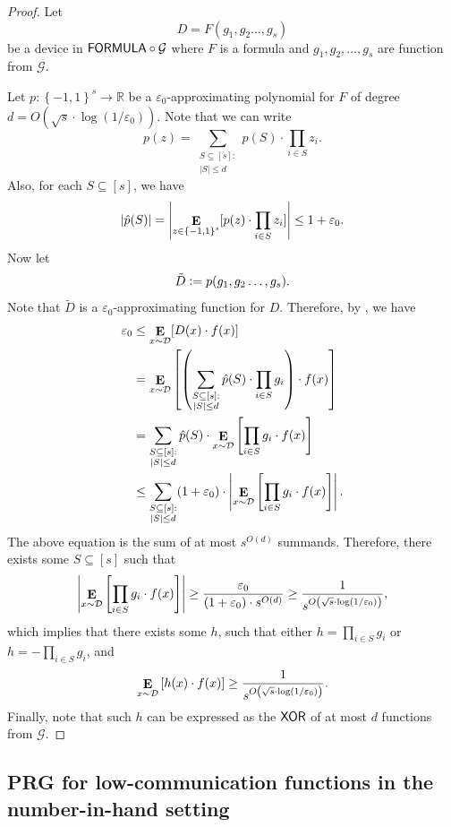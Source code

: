 \documentclass[10pt,a4paper]{article}
\DeclareMathOperator*\Exp{{\bf E}}
\newcommand{\boolpm}{\left\{-1,1\right\}}
\newcommand{\FORMULA}{{\sf FORMULA}}
\newcommand{\XOR}{{\sf XOR}}
\newcommand{\real}{\mathbb{R}}
\begin{document}
    \begin{proof}
		Let 
		\[
			D = F(g_1,g_2\dots,g_s)
		\]
		be a device in $\FORMULA\circ\mathcal{G}$ where $F$ is a formula and $g_1,g_2,\dots,g_s$ are function from $\mathcal{G}$.

		Let $p\colon\boolpm^s\to\real$ be a $\varepsilon_0$-approximating polynomial for $F$ of degree $d=O(\sqrt{s}\cdot\log(1/\varepsilon_0))$. Note that we can write
		\[
			p(z)=\sum_{\substack{S\subseteq[s]: \\ |S|\leq d}}\hat{p}(S)\cdot\prod_{i\in S}z_i.
		\]
		Also, for each $S\subseteq[s]$, we have
		\[
			|\hat{p}(S)|=\left| \Exp_{z\in\boolpm^s}[p(z)\cdot\prod_{i\in S}z_i] \right| \leq  1+\varepsilon_0.
		\]
		Now let
		\[
			\tilde{D} \vcentcolon= p(g_1,g_2\dots,g_s).
		\]
		Note that $\tilde{D}$ is a $\varepsilon_0$-approximating function for $D$. Therefore, by , we have
		\begin{align*}
			\varepsilon_0 &\leq \Exp_{x\sim\mathcal{D}}[D(x)\cdot f(x)]\\
			&= \Exp_{x\sim\mathcal{D}}\left[\left(\sum_{\substack{S\subseteq[s]: \\ |S|\leq d}}\hat{p}(S)\cdot\prod_{i\in S}g_i \right) \cdot f(x)\right]\\
			&=\sum_{\substack{S\subseteq[s]: \\ |S|\leq d}}\hat{p}(S)\cdot \Exp_{x\sim\mathcal{D}}\left[\prod_{i\in S}g_i\cdot f(x)\right]\\
			&\leq \sum_{\substack{S\subseteq[s]: \\ |S|\leq d}} (1+\varepsilon_0) \cdot \left| \Exp_{x\sim\mathcal{D}}\left[\prod_{i\in S}g_i\cdot f(x)\right] \right|.
		\end{align*}
		The above equation is the sum of at most $s^{O(d)}$ summands. Therefore, there exists some $S\subseteq[s]$ such that
		\[
			\left|\Exp_{x\sim\mathcal{D}}\left[\prod_{i\in S}g_i\cdot f(x)\right]\right| \geq \frac{\varepsilon_0}{(1+\varepsilon_0)\cdot s^{O(d)}}\geq \frac{1}{s^{O\left(\sqrt{s}\cdot\log(1/\varepsilon_0)\right)}},
		\]
		which implies that there exists some $h$, such that either $h=\prod_{i\in S}g_i$ or $h=-\prod_{i\in S}g_i$, and
		\[
			\Exp_{x\sim\mathcal{D}}\left[h(x)\cdot f(x)\right] \geq \frac{1}{s^{O\left(\sqrt{s}\cdot\log(1/\varepsilon_0)\right)}}.
		\]
		Finally, note that such $h$ can be expressed as the $\XOR$ of at most $d$ functions from $\mathcal{G}$.
    \end{proof}
    

    \subsection{PRG for low-communication functions in the number-in-hand setting}\label{appendix:prg_cc}
	
\end{document}
